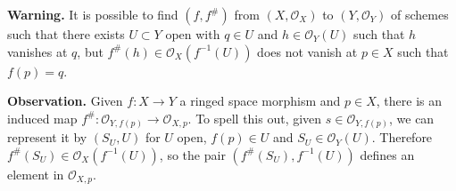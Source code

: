 \documentclass{article}
\theoremstyle{definition}
\begin{document}

\textbf{Warning.} It is possible to find $(f,f^\#)$ from $(X, \mathcal{O}_X)$ to $(Y, \mathcal{O}_Y)$ of schemes such that there exists $U \subset Y$ open with $q \in U$ and $h \in \mathcal{O}_Y(U)$ such that $h$ vanishes at $q$, but $f^\#(h) \in \mathcal{O}_X(f^{-1}(U))$ does not vanish at $p \in X$ such that $f(p) = q$.
\vspace{1mm}
 
\textbf{Observation.} Given $f : X \to Y$ a ringed space morphism and $p \in X$, there is an induced map $f^\# : \mathcal{O}_{Y,f(p)} \to \mathcal{O}_{X,p}$. To spell this out, given $s \in \mathcal{O}_{Y,f(p)}$, we can represent it by $(S_U,U)$ for $U$ open, $f(p) \in U$ and $S_U \in \mathcal{O}_Y(U)$. Therefore $f^\#(S_U) \in \mathcal{O}_X(f^{-1}(U))$, so the pair $(f^\#(S_U), f^{-1}(U))$ defines an element in $\mathcal{O}_{X,p}$.
\end{document}

